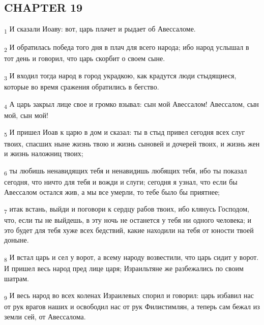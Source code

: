 \subsection{CHAPTER 19}
\begin{tcolorbox}
\textsubscript{1} И сказали Иоаву: вот, царь плачет и рыдает об Авессаломе.
\end{tcolorbox}
\begin{tcolorbox}
\textsubscript{2} И обратилась победа того дня в плач для всего народа; ибо народ услышал в тот день и говорил, что царь скорбит о своем сыне.
\end{tcolorbox}
\begin{tcolorbox}
\textsubscript{3} И входил тогда народ в город украдкою, как крадутся люди стыдящиеся, которые во время сражения обратились в бегство.
\end{tcolorbox}
\begin{tcolorbox}
\textsubscript{4} А царь закрыл лице свое и громко взывал: сын мой Авессалом! Авессалом, сын мой, сын мой!
\end{tcolorbox}
\begin{tcolorbox}
\textsubscript{5} И пришел Иоав к царю в дом и сказал: ты в стыд привел сегодня всех слуг твоих, спасших ныне жизнь твою и жизнь сыновей и дочерей твоих, и жизнь жен и жизнь наложниц твоих;
\end{tcolorbox}
\begin{tcolorbox}
\textsubscript{6} ты любишь ненавидящих тебя и ненавидишь любящих тебя, ибо ты показал сегодня, что ничто для тебя и вожди и слуги; сегодня я узнал, что если бы Авессалом остался жив, а мы все умерли, то тебе было бы приятнее;
\end{tcolorbox}
\begin{tcolorbox}
\textsubscript{7} итак встань, выйди и поговори к сердцу рабов твоих, ибо клянусь Господом, что, если ты не выйдешь, в эту ночь не останется у тебя ни одного человека; и это будет для тебя хуже всех бедствий, какие находили на тебя от юности твоей доныне.
\end{tcolorbox}
\begin{tcolorbox}
\textsubscript{8} И встал царь и сел у ворот, а всему народу возвестили, что царь сидит у ворот. И пришел весь народ пред лице царя; Израильтяне же разбежались по своим шатрам.
\end{tcolorbox}
\begin{tcolorbox}
\textsubscript{9} И весь народ во всех коленах Израилевых спорил и говорил: царь избавил нас от рук врагов наших и освободил нас от рук Филистимлян, а теперь сам бежал из земли сей, от Авессалома.
\end{tcolorbox}
